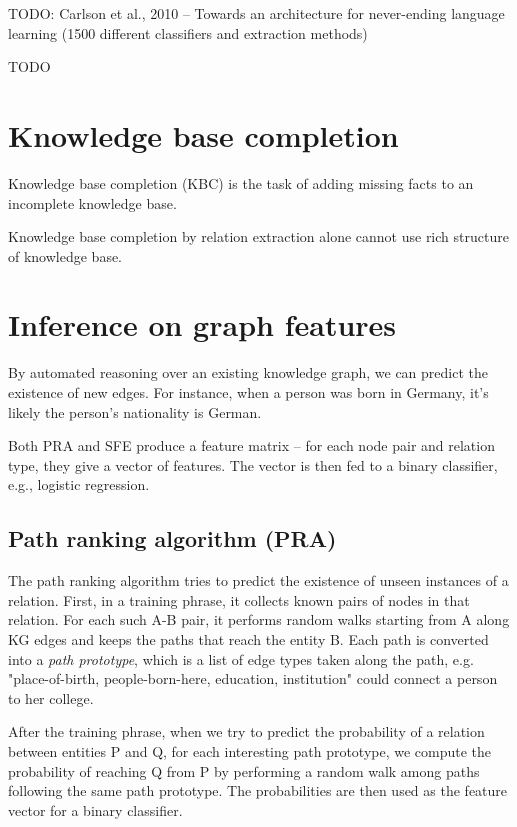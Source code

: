 TODO: Carlson et al., 2010 -- Towards an architecture for never-ending language
learning (1500 different classifiers and extraction methods)

TODO

\section{Knowledge base completion}

Knowledge base completion (KBC) is the task of adding missing facts to an
incomplete knowledge base.

Knowledge base completion by relation extraction alone cannot use rich structure
of knowledge base.

\section{Inference on graph features}

By automated reasoning over an existing knowledge graph, we can predict the
existence of new edges. For instance, when a person was born in Germany, it's
likely the person's nationality is German.

Both PRA and SFE produce a feature matrix -- for each node pair and relation
type, they give a vector of features. The vector is then fed to a binary
classifier, e.g., logistic regression.

\subsection{Path ranking algorithm (PRA)}
\label{path-ranking-algorithm}

The path ranking algorithm\cite{path-ranking-algorithm}
tries to predict the existence of unseen instances of a relation.
First, in a training phrase, it collects known pairs of nodes in that relation.
For each such A-B pair, it performs random walks starting from A along KG edges
and keeps the paths that reach the entity B. Each path is converted into a
\textit{path prototype}, which is a list of edge types taken along the path, e.g.
"place-of-birth, people-born-here, education, institution" could connect a
person to her college.

After the training phrase, when we try to predict the probability of a relation
between entities P and Q, for each interesting path prototype, we compute the
probability of reaching Q from P by performing a random walk among paths
following the same path prototype.
The probabilities are then used as the feature vector for a binary classifier.

